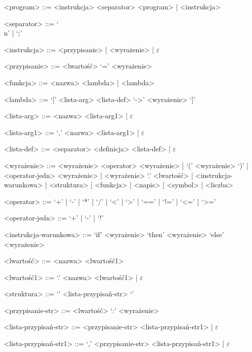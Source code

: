 \documentclass[4paper,10pt]{article}
\begin{document}
\begin{grammar}
<program>       ::= <instrukcja> <separator> <program> | <instrukcja>

<separator>     ::= `\\n' | `;'

<instrukcja>    ::= <przypisanie> | <wyrażenie> | $\varepsilon$


<przypisanie>   ::= <lwartość> `=' <wyrażenie>

%
\vskip 0.5cm

<funkcja>       ::= <nazwa> <lambda> | <lambda>

<lambda>        ::= `[' <lista-arg> <lista-def> `->' <wyrażenie> `]'

<lista-arg>     ::= <nazwa> <lista-arg1> | $\varepsilon$

<lista-arg1>    ::= `,' <nazwa> <lista-arg1> | $\varepsilon$

<lista-def>     ::= <separator> <definicja> <lista-def> | $\varepsilon$

%
\vskip 0.5cm

<wyrażenie>     ::= <wyrażenie> <operator> <wyrażenie> | `(' <wyrażenie> `)' | <operator-jedn> <wyrażenie> | <wyrażenie> `.' <lwartość> | <instrukcja-warunkowa> | <struktura> | <funkcja> | <napis> | <symbol> | <liczba>

<operator>      ::= `+' | `-' | `*' | `/' | `<' | `>' | `==' | `!=' | `<=' | `>='

<operator-jedn> ::= `+' | `-' | `!'

\vskip 0.5cm

<instrukcja-warunkowa> ::= `if' <wyrażenie> `then' <wyrażenie> `else' <wyrażenie>

\vskip 0.5cm

<lwartość>      ::= <nazwa> <lwartość1>

<lwartość1>		::= `.' <nazwa> <lwartość1> | $\varepsilon$

<struktura>              ::= `{' <lista-przypisań-str> `}'

<przypisanie-str>        ::= <lwartość> `:' <wyrażenie>

<lista-przypisań-str>    ::= <przypisanie-str> <lista-przypisań-str1> | $\varepsilon$

<lista-przypisań-str1>   ::= `,' <przypisanie-str> <lista-przypisań-str1> | $\varepsilon$


\end{grammar}
\end{document}
